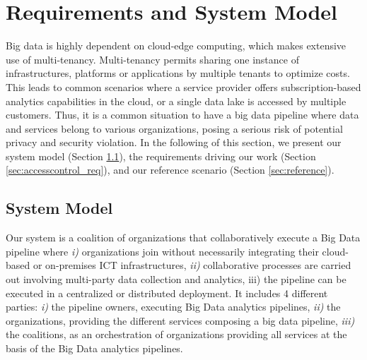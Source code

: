 \section{Requirements and System Model}\label{sec:requirements}
Big data is highly dependent on cloud-edge computing, which makes extensive use of multi-tenancy.
Multi-tenancy permits sharing one instance of infrastructures,
platforms or applications by multiple tenants to optimize costs.
This leads to common scenarios where a service provider offers subscription-based analytics capabilities in the cloud,
or a single data lake is accessed by multiple customers.
Thus, it is a common situation to have a big data pipeline where data and services belong to various organizations,
posing a serious risk of potential privacy and security violation.
In the following of this section, we present our system model (Section \ref{sec:systemmodel}),
the requirements driving our work (Section \ref{sec:accesscontrol_req}),
and our reference scenario (Section \ref{sec:reference}).

\subsection{System Model}\label{sec:systemmodel}
Our system is a coalition of organizations that collaboratively execute a Big Data pipeline where \emph{i)} organizations join without necessarily integrating their cloud-based or on-premises ICT infrastructures, \emph{ii)} collaborative processes are carried out involving multi-party data collection and analytics, iii) the pipeline can be executed in a centralized or distributed deployment.
It includes 4 different parties: \emph{i)} the pipeline owners, executing Big Data analytics pipelines, \emph{ii)} the organizations, providing the different services composing a big data pipeline, \emph{iii)} the coalitions, as an orchestration of organizations providing all services at the basis of the Big Data analytics pipelines.


